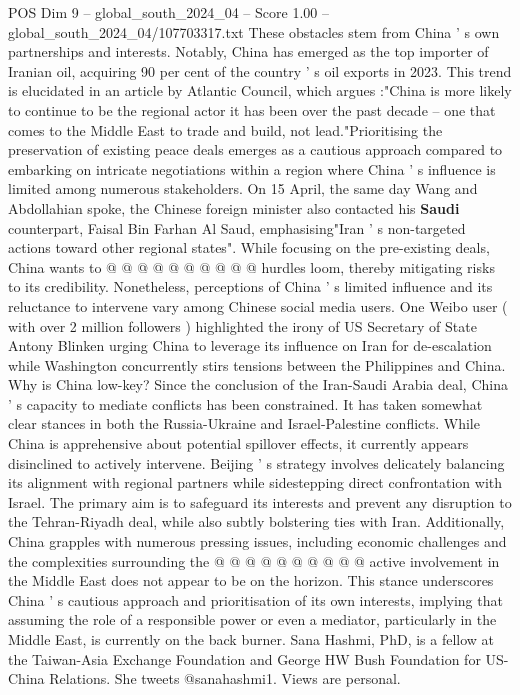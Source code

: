 \begin{textsample}{POS Dim 9 – global\_south\_2024\_04 – Score 1.00 – global\_south\_2024\_04/107703317.txt}
These obstacles stem from China ' s own partnerships and interests.
Notably, China has emerged as the top importer of Iranian oil, acquiring 90 per cent of the country ' s oil exports in 2023.
This trend is elucidated in an article by Atlantic Council, which argues :"China is more likely to continue to be the regional actor it has been over the past decade -- one that comes to the Middle East to trade and build, not lead."Prioritising the preservation of existing peace deals emerges as a cautious approach compared to embarking on intricate negotiations within a region where China ' s influence is limited among numerous stakeholders.
On 15 April, the same day Wang and Abdollahian spoke, the Chinese foreign minister also contacted his \textbf{Saudi} counterpart, Faisal Bin Farhan Al Saud, emphasising"Iran ' s non-targeted actions toward other regional states".
While focusing on the pre-existing deals, China wants to @ @ @ @ @ @ @ @ @ @ hurdles loom, thereby mitigating risks to its credibility.
Nonetheless, perceptions of China ' s limited influence and its reluctance to intervene vary among Chinese social media users.
One Weibo user ( with over 2 million followers ) highlighted the irony of US Secretary of State Antony Blinken urging China to leverage its influence on Iran for de-escalation while Washington concurrently stirs tensions between the Philippines and China.
Why is China low-key?
Since the conclusion of the Iran-Saudi Arabia deal, China ' s capacity to mediate conflicts has been constrained.
It has taken somewhat clear stances in both the Russia-Ukraine and Israel-Palestine conflicts.
While China is apprehensive about potential spillover effects, it currently appears disinclined to actively intervene.
Beijing ' s strategy involves delicately balancing its alignment with regional partners while sidestepping direct confrontation with Israel.
The primary aim is to safeguard its interests and prevent any disruption to the Tehran-Riyadh deal, while also subtly bolstering ties with Iran.
Additionally, China grapples with numerous pressing issues, including economic challenges and the complexities surrounding the @ @ @ @ @ @ @ @ @ @ active involvement in the Middle East does not appear to be on the horizon.
This stance underscores China ' s cautious approach and prioritisation of its own interests, implying that assuming the role of a responsible power or even a mediator, particularly in the Middle East, is currently on the back burner.
Sana Hashmi, PhD, is a fellow at the Taiwan-Asia Exchange Foundation and George HW Bush Foundation for US-China Relations.
She tweets @sanahashmi1.
Views are personal.

\end{textsample}
